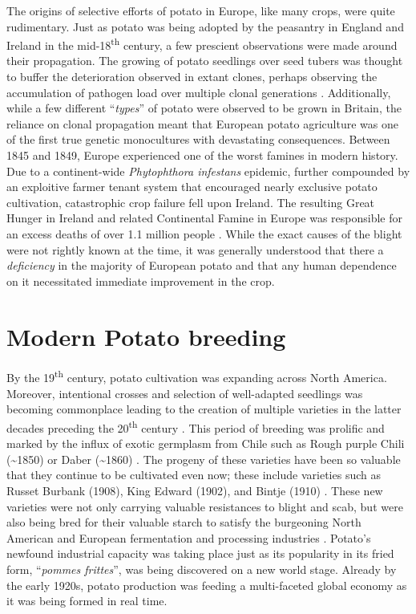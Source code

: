 \documentclass[
]{article}
\begin{document}
The origins of selective efforts of potato in Europe, like many crops,
were quite rudimentary. Just as potato was being adopted by the
peasantry in England and Ireland in the mid-18\textsuperscript{th}
century, a few prescient observations were made around their
propagation. The growing of potato seedlings over seed tubers was
thought to buffer the deterioration observed in extant clones, perhaps
observing the accumulation of pathogen load over multiple clonal
generations \autocite{Glendinning1983a}. Additionally, while a few
different ``\emph{types}'' of potato were observed to be grown in
Britain, the reliance on clonal propagation meant that European potato
agriculture was one of the first true genetic monocultures with
devastating consequences. Between 1845 and 1849, Europe experienced one
of the worst famines in modern history. Due to a continent-wide
\emph{Phytophthora infestans} epidemic, further compounded by an
exploitive farmer tenant system that encouraged nearly exclusive potato
cultivation, catastrophic crop failure fell upon Ireland. The resulting
Great Hunger in Ireland and related Continental Famine in Europe was
responsible for an excess deaths of over 1.1 million people
\autocite{Zadoks2008}. While the exact causes of the blight were not
rightly known at the time, it was generally understood that there a
\emph{deficiency} in the majority of European potato and that any human
dependence on it necessitated immediate improvement in the crop.

\section{Modern Potato breeding}\label{modern-potato-breeding}

By the 19\textsuperscript{th} century, potato cultivation was expanding
across North America. Moreover, intentional crosses and selection of
well-adapted seedlings was becoming commonplace leading to the creation
of multiple varieties in the latter decades preceding the
20\textsuperscript{th} century \autocite{Stevenson1937}. This period of
breeding was prolific and marked by the influx of exotic germplasm from
Chile such as Rough purple Chili (\textasciitilde1850) or Daber
(\textasciitilde1860) \autocite{Glendinning1983a,Plaisted1989}. The
progeny of these varieties have been so valuable that they continue to
be cultivated even now; these include varieties such as Russet Burbank
(1908), King Edward (1902), and Bintje (1910) \autocite{VanBerloo2007}.
These new varieties were not only carrying valuable resistances to
blight and scab, but were also being bred for their valuable starch to
satisfy the burgeoning North American and European fermentation and
processing industries \autocite{Willard1993}. Potato's newfound
industrial capacity was taking place just as its popularity in its fried
form, ``\emph{pommes frittes}'', was being discovered on a new world
stage. Already by the early 1920s, potato production was feeding a
multi-faceted global economy as it was being formed in real time.
\end{document}
